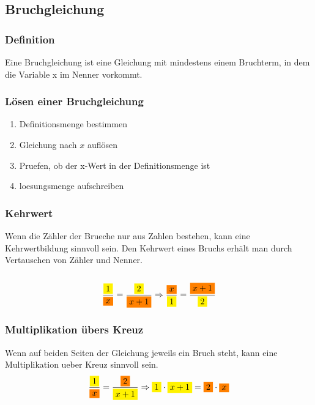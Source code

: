\begin{multicols}{2}
    \subsection{Bruchgleichung}
    \vspace{-4mm}
    \subsubsection{Definition}
    \vspace{-4mm}
    Eine Bruchgleichung ist eine Gleichung mit mindestens einem Bruchterm, in dem die Variable x im Nenner vorkommt.
    \subsubsection{Lösen einer Bruchgleichung}
    \vspace{-4mm}
    \begin{enumerate}
        \item Definitionsmenge bestimmen
        \item Gleichung nach $x$ auflösen
        \item Pruefen, ob der x-Wert in der Definitionsmenge ist
        \item loesungsmenge aufschreiben
    \end{enumerate}
    \subsubsection{Kehrwert}
    \vspace{-4mm}
    Wenn die Zähler der Brueche nur aus Zahlen bestehen, kann eine Kehrwertbildung sinnvoll sein.
    Den Kehrwert eines Bruchs erhält man durch Vertauschen von Zähler und Nenner.\\~\\
    \[\frac{{\colorbox{yellow}{$1$}}}{{\colorbox{orange}{$x$}}} = \frac{{\colorbox{yellow}{$2$}}}{{\colorbox{orange}{$x+1$}}} \Rightarrow  \frac{{\colorbox{orange}{$x$}}}{{\colorbox{yellow}{$1$}}} = \frac{{\colorbox{orange}{$x+1$}}}{{\colorbox{yellow}{$2$}}}\]


    \subsubsection{Multiplikation übers Kreuz}
    \vspace{-4mm}
    Wenn auf beiden Seiten der Gleichung jeweils ein Bruch steht, kann eine Multiplikation ueber Kreuz sinnvoll sein.
    \[\frac{{\colorbox{yellow}{$1$}}}{{\colorbox{orange}{$x$}}} = \frac{{\colorbox{orange}{$2$}}}{{\colorbox{yellow}{$x+1$}}} \Rightarrow {\colorbox{yellow}{$1$}} \cdot {\colorbox{yellow}{$x+1$}} = {\colorbox{orange}{$2$}} \cdot {\colorbox{orange}{$x$}}\]



\end{multicols}
